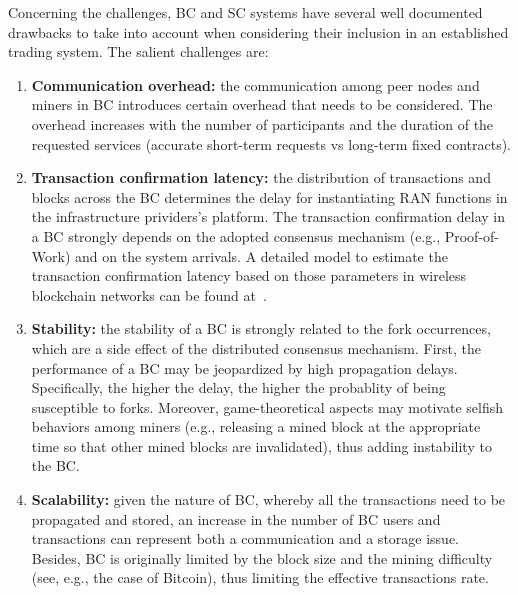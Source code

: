 \documentclass[journal]{IEEEtran}
\begin{document}
Concerning the challenges, BC and SC systems have several well documented drawbacks to take into account when considering their inclusion in an established trading system. The salient challenges are: 
\begin{enumerate}
    \item \textbf{Communication overhead:} the communication among peer nodes and miners in BC introduces certain overhead that needs to be considered. The overhead increases with the number of participants and the duration of the requested services (accurate short-term requests vs long-term fixed contracts).
    \item \textbf{Transaction confirmation latency:} the distribution of transactions and blocks across the BC determines the delay for instantiating RAN functions in the infrastructure prividers's platform. The transaction confirmation delay in a BC strongly depends on the adopted consensus mechanism (e.g., Proof-of-Work) and on the system arrivals. A detailed model to estimate the transaction confirmation latency based on those parameters in wireless blockchain networks can be found at~\cite{FWilhelmi_PIMRC}.
    \item \textbf{Stability:} the stability of a BC is strongly related to the fork occurrences, which are a side effect of the distributed consensus mechanism. First, the performance of a BC may be jeopardized by high propagation delays. Specifically, the higher the delay, the higher the probablity of being susceptible to forks. Moreover, game-theoretical aspects may motivate selfish behaviors among miners (e.g., releasing a mined block at the appropriate time so that other mined blocks are invalidated), thus adding instability to the BC.
    \item \textbf{Scalability:} given the nature of BC, whereby all the transactions need to be propagated and stored, an increase in the number of BC users and transactions can represent both a communication and a storage issue. Besides, BC is originally limited by the block size and the mining difficulty (see, e.g., the case of Bitcoin), thus limiting the effective transactions rate. 
\end{enumerate}

\end{document}
